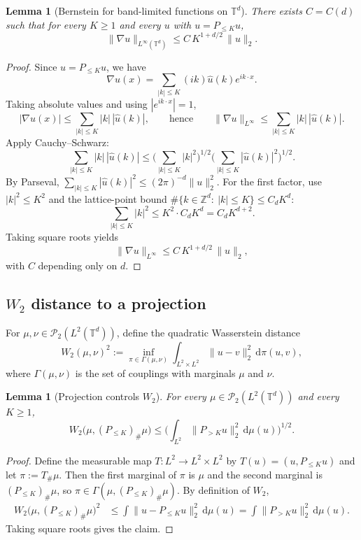 \documentclass{article}
\numberwithin{equation}{section}
\theoremstyle{plain}
\newtheorem{lemma}[theorem]{Lemma}
\theoremstyle{definition}
\theoremstyle{remark}
\begin{document}
\begin{lemma}[Bernstein for band-limited functions on $\mathbb{T}^d$]
\label{lem:bernstein}
There exists $C=C(d)$ such that for every $K\ge 1$ and every $u$ with $u=P_{\le K}u$,
\[
\|\nabla u\|_{L^\infty(\mathbb{T}^d)} \le C\,K^{1+d/2}\,\|u\|_2.
\]
\end{lemma}

\begin{proof}
Since $u=P_{\le K}u$, we have
\[
\nabla u(x)=\sum_{|k|\le K}(ik)\widehat u(k)e^{ik\cdot x}.
\]
Taking absolute values and using $|e^{ik\cdot x}|=1$,
\[
|\nabla u(x)|\le \sum_{|k|\le K}|k|\,|\widehat u(k)|,
\qquad\text{hence}\qquad
\|\nabla u\|_{L^\infty}\le \sum_{|k|\le K}|k|\,|\widehat u(k)|.
\]
Apply Cauchy--Schwarz:
\[
\sum_{|k|\le K}|k|\,|\widehat u(k)|
\le
\Big(\sum_{|k|\le K}|k|^2\Big)^{1/2}
\Big(\sum_{|k|\le K}|\widehat u(k)|^2\Big)^{1/2}.
\]
By Parseval, $\sum_{|k|\le K}|\widehat u(k)|^2 \le (2\pi)^{-d}\|u\|_2^2$.
For the first factor, use $|k|^2\le K^2$ and the lattice-point bound
$\#\{k\in\mathbb{Z}^d:\ |k|\le K\}\le C_d K^d$:
\[
\sum_{|k|\le K}|k|^2 \le K^2\cdot C_d K^d = C_d K^{d+2}.
\]
Taking square roots yields
\[
\|\nabla u\|_{L^\infty}\le C\,K^{1+d/2}\,\|u\|_2,
\]
with $C$ depending only on $d$.
\end{proof}

\subsection{$W_2$ distance to a projection}

For $\mu,\nu\in\mathcal{P}_2(L^2(\mathbb{T}^d))$, define the quadratic Wasserstein distance
\[
W_2(\mu,\nu)^2
:=\inf_{\pi\in\Gamma(\mu,\nu)}
\int_{L^2\times L^2}\|u-v\|_2^2\,\mathrm{d}\pi(u,v),
\]
where $\Gamma(\mu,\nu)$ is the set of couplings with marginals $\mu$ and $\nu$.

\begin{lemma}[Projection controls $W_2$]
\label{lem:projW2}
For every $\mu\in\mathcal{P}_2(L^2(\mathbb{T}^d))$ and every $K\ge 1$,
\[
W_2\big(\mu,(P_{\le K})_\#\mu\big)
\le
\Big(\int_{L^2}\|P_{>K}u\|_2^2\,\mathrm{d}\mu(u)\Big)^{1/2}.
\]
\end{lemma}

\begin{proof}
Define the measurable map $T:L^2\to L^2\times L^2$ by $T(u)=(u,P_{\le K}u)$
and let $\pi:=T_\#\mu$. Then the first marginal of $\pi$ is $\mu$ and the second marginal is
$(P_{\le K})_\#\mu$, so $\pi\in\Gamma(\mu,(P_{\le K})_\#\mu)$.
By definition of $W_2$,
\begin{align*}
W_2\big(\mu,(P_{\le K})_\#\mu\big)^2
&\le \int\|u-P_{\le K}u\|_2^2\,\mathrm{d}\mu(u)
= \int\|P_{>K}u\|_2^2\,\mathrm{d}\mu(u).
\end{align*}
Taking square roots gives the claim.
\end{proof}
\end{document}
